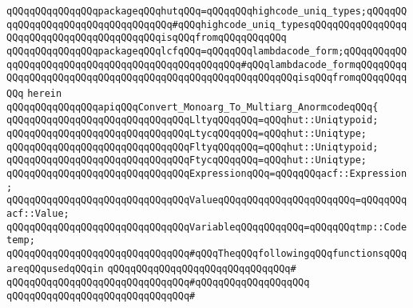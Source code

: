 \verb|qQQqqQQqqQQqqQQqpackageqQQqhutqQQq=qQQqqQQqhighcode_uniq_types;qQQqqQQqqQQqqQQqqQQqqQQqqQQqqQQqqQQq#qQQqhighcode_uniq_typesqQQqqQQqqQQqqQQqqQQqqQQqqQQqqQQqqQQqqQQqqQQqisqQQqfromqQQqqQQqqQQq|\newline
\verb|qQQqqQQqqQQqqQQqpackageqQQqlcfqQQq=qQQqqQQqlambdacode_form;qQQqqQQqqQQqqQQqqQQqqQQqqQQqqQQqqQQqqQQqqQQqqQQqqQQq#qQQqlambdacode_formqQQqqQQqqQQqqQQqqQQqqQQqqQQqqQQqqQQqqQQqqQQqqQQqqQQqqQQqqQQqisqQQqfromqQQqqQQqqQQq|\newline
\verb|herein|\newline
\newline
\verb|qQQqqQQqqQQqqQQqapiqQQqConvert_Monoarg_To_Multiarg_AnormcodeqQQq{|\newline
\newline
\verb|qQQqqQQqqQQqqQQqqQQqqQQqqQQqqQQqLltyqQQqqQQq=qQQqhut::Uniqtypoid;|\newline
\verb|qQQqqQQqqQQqqQQqqQQqqQQqqQQqqQQqLtycqQQqqQQq=qQQqhut::Uniqtype;|\newline
\newline
\verb|qQQqqQQqqQQqqQQqqQQqqQQqqQQqqQQqFltyqQQqqQQq=qQQqhut::Uniqtypoid;|\newline
\verb|qQQqqQQqqQQqqQQqqQQqqQQqqQQqqQQqFtycqQQqqQQq=qQQqhut::Uniqtype;|\newline
\newline
\verb|qQQqqQQqqQQqqQQqqQQqqQQqqQQqqQQqExpressionqQQq=qQQqqQQqacf::Expression;|\newline
\verb|qQQqqQQqqQQqqQQqqQQqqQQqqQQqqQQqValueqQQqqQQqqQQqqQQqqQQqqQQq=qQQqqQQqacf::Value;|\newline
\verb|qQQqqQQqqQQqqQQqqQQqqQQqqQQqqQQqVariableqQQqqQQqqQQq=qQQqqQQqtmp::Codetemp;|\newline
\newline
\verb|qQQqqQQqqQQqqQQqqQQqqQQqqQQqqQQq#qQQqTheqQQqfollowingqQQqfunctionsqQQqareqQQqusedqQQqin|\newline
\verb|qQQqqQQqqQQqqQQqqQQqqQQqqQQqqQQq#|\newline
\verb|qQQqqQQqqQQqqQQqqQQqqQQqqQQqqQQq#qQQqqQQqqQQqqQQqqQQq|\newline
\verb|qQQqqQQqqQQqqQQqqQQqqQQqqQQqqQQq#|\newline
